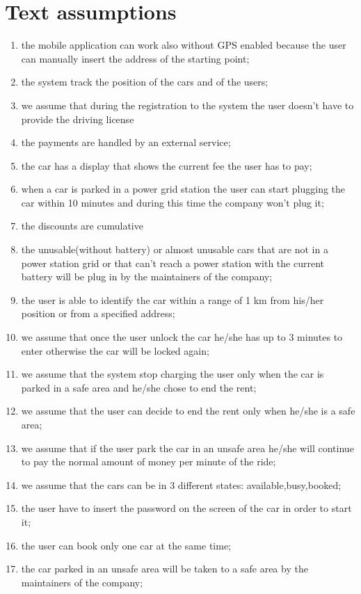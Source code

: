 \section{Text assumptions}
\begin{enumerate}
	\item the mobile application can work also without GPS enabled because the user can manually insert the address of the starting point;
	\item the system track the position of the cars and of the users;
	\item we assume that during the registration to the system the user doesn't have to provide the driving license
	\item the payments are handled by an external service;
	\item the car has a display that shows the current fee the user has to pay;
	\item when a car is parked in a power grid station the user can start plugging the car within 10 minutes and during this time the company won't plug it;
	\item the discounts are cumulative
	\item the unusable(without battery) or almost unusable cars that are not in a power station grid or that can't reach a power station with the current battery will be plug in by the maintainers of the company;
	\item the user is able to identify the car within a range of 1 km from his/her position or from a specified address;
	\item we assume that once the user unlock the car he/she has up to 3 minutes to enter otherwise the car will be locked again;
	\item we assume that the system stop charging the user only when the car is parked in a safe area and he/she chose to end the rent;
	\item we assume that the user can decide to end the rent only when he/she is a safe area;
	\item we assume that if the user park the car in an unsafe area he/she will continue to pay the normal amount of money per minute of the ride;
	\item we assume that the cars can be in 3 different states: available,busy,booked;
	\item the user have to insert the password on the screen of the car in order to start it;
	\item the user can book only one car at the same time;
	\item the car parked in an unsafe area will be taken to a safe area by the maintainers of the company;

\end{enumerate}

